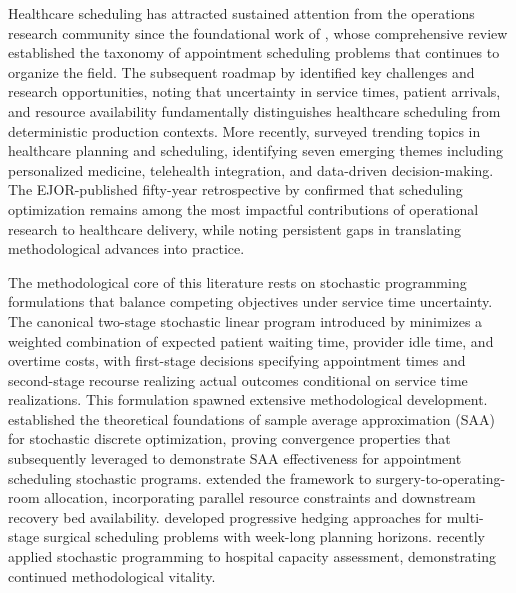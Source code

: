 \documentclass[11pt,a4paper]{article}
\begin{document}
Healthcare scheduling has attracted sustained attention from the operations research community since the foundational work of \citet{cayirli2003outpatient}, whose comprehensive review established the taxonomy of appointment scheduling problems that continues to organize the field. The subsequent roadmap by \citet{gupta2008appointment} identified key challenges and research opportunities, noting that uncertainty in service times, patient arrivals, and resource availability fundamentally distinguishes healthcare scheduling from deterministic production contexts. More recently, \citet{youn2022planning} surveyed trending topics in healthcare planning and scheduling, identifying seven emerging themes including personalized medicine, telehealth integration, and data-driven decision-making. The EJOR-published fifty-year retrospective by \citet{belien2025fifty} confirmed that scheduling optimization remains among the most impactful contributions of operational research to healthcare delivery, while noting persistent gaps in translating methodological advances into practice.

The methodological core of this literature rests on stochastic programming formulations that balance competing objectives under service time uncertainty. The canonical two-stage stochastic linear program introduced by \citet{denton2003sequential} minimizes a weighted combination of expected patient waiting time, provider idle time, and overtime costs, with first-stage decisions specifying appointment times and second-stage recourse realizing actual outcomes conditional on service time realizations. This formulation spawned extensive methodological development. \citet{kleywegt2002sample} established the theoretical foundations of sample average approximation (SAA) for stochastic discrete optimization, proving convergence properties that \citet{mancilla2012sample} subsequently leveraged to demonstrate SAA effectiveness for appointment scheduling stochastic programs. \citet{denton2010optimal} extended the framework to surgery-to-operating-room allocation, incorporating parallel resource constraints and downstream recovery bed availability. \citet{gul2015progressive} developed progressive hedging approaches for multi-stage surgical scheduling problems with week-long planning horizons. \citet{marchesi2025stochastic} recently applied stochastic programming to hospital capacity assessment, demonstrating continued methodological vitality.
\end{document}
